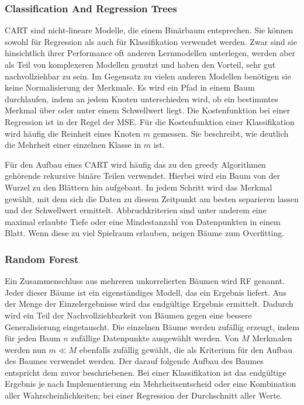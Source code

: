 	
		\subsubsection{Classification And Regression Trees}
		
		\ac{CART} sind nicht-lineare Modelle, die einem Binärbaum entsprechen. Sie können sowohl für Regression als auch für Klassifikation verwendet werden. Zwar sind sie hinsichtlich ihrer Performance oft anderen Lernmodellen unterlegen, werden aber als Teil von komplexeren Modellen genutzt und haben den Vorteil, sehr gut nachvollziehbar zu sein. Im Gegensatz zu vielen anderen Modellen benötigen sie keine Normalisierung der Merkmale. Es wird ein Pfad in einem Baum durchlaufen, indem an jedem Knoten unterschieden wird, ob ein bestimmtes Merkmal über oder unter einem Schwellwert liegt. Die Kostenfunktion bei einer Regression ist in der Regel der \ac{MSE}. Für die Kostenfunktion einer Klassifikation wird häufig die \glqq{}Reinheit\grqq{} eines Knoten $m$ gemessen. Sie beschreibt, wie deutlich die Mehrheit einer einzelnen Klasse in $m$ ist.
		
		Für den Aufbau eines \ac{CART} wird häufig das zu den greedy Algorithmen gehörende rekursive binäre Teilen verwendet. Hierbei wird ein Baum von der Wurzel zu den Blättern hin aufgebaut. In jedem Schritt wird das Merkmal gewählt, mit dem sich die Daten zu diesem Zeitpunkt am besten separieren lassen und der Schwellwert ermittelt. Abbruchkriterien sind unter anderem eine maximal erlaubte Tiefe oder eine Mindestanzahl von Datenpunkten in einem Blatt. Wenn diese zu viel Spielraum erlauben, neigen Bäume zum Overfitting.
		
		\subsubsection{Random Forest}
		
		Ein Zusammenschluss aus mehreren unkorrelierten Bäumen wird \acf{RF} genannt. Jeder dieser Bäume ist ein eigenständiges Modell, das ein Ergebnis liefert. Aus der Menge der Einzelergebnisse wird das endgültige Ergebnis ermittelt. Dadurch wird ein Teil der Nachvollziehbarkeit von Bäumen gegen eine bessere Generalisierung eingetauscht. Die einzelnen Bäume werden zufällig erzeugt, indem für jeden Baum $n$ zufällige Datenpunkte ausgewählt werden. Von $M$ Merkmalen werden nun $m \ll M$ ebenfalls zufällig gewählt, die als Kriterium für den Aufbau des Baumes verwendet werden. Der darauf folgende Aufbau des Baumes entspricht dem zuvor beschriebenen. Bei einer Klassifikation ist das endgültige Ergebnis je nach Implementierung ein Mehrheitsentscheid oder eine Kombination aller Wahrscheinlichkeiten; bei einer Regression der Durchschnitt aller Werte.
		
